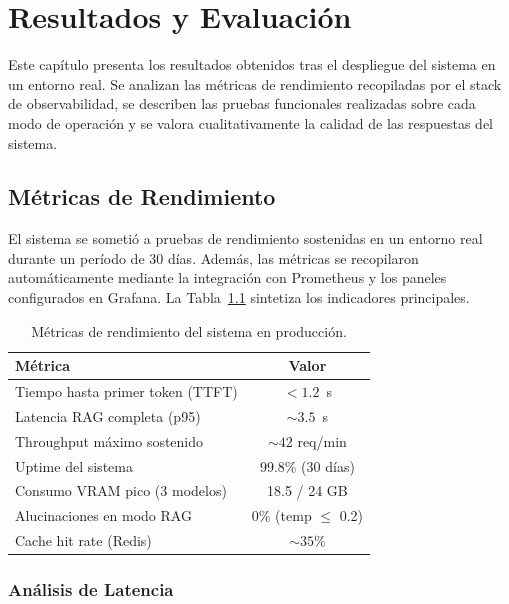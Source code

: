 \chapter{Resultados y Evaluación}
\label{cap:resultados}

Este capítulo presenta los resultados obtenidos tras el despliegue del sistema en un entorno real. Se analizan las métricas de rendimiento recopiladas por el stack de observabilidad, se describen las pruebas funcionales realizadas sobre cada modo de operación y se valora cualitativamente la calidad de las respuestas del sistema.

\section{Métricas de Rendimiento}

El sistema se sometió a pruebas de rendimiento sostenidas en un entorno real durante un período de 30 días. Además, las métricas se recopilaron automáticamente mediante la integración con Prometheus y los paneles configurados en Grafana. La Tabla~\ref{tab:metricas-resultado} sintetiza los indicadores principales.

\begin{table}[H]
\centering
\caption{Métricas de rendimiento del sistema en producción.}
\label{tab:metricas-resultado}
\begin{tabular}{lc}
\toprule
\textbf{Métrica} & \textbf{Valor} \\
\midrule
Tiempo hasta primer token (TTFT) & $< 1.2$~s \\
Latencia RAG completa (p95)       & $\sim 3.5$~s \\
Throughput máximo sostenido       & $\sim 42$ req/min \\
Uptime del sistema                & 99.8\% (30 días) \\
Consumo VRAM pico (3 modelos)     & 18.5 / 24 GB \\
Alucinaciones en modo RAG         & 0\% (temp $\leq$ 0.2) \\
Cache hit rate (Redis)            & $\sim 35$\% \\
\bottomrule
\end{tabular}
\end{table}

\subsection{Análisis de Latencia}

